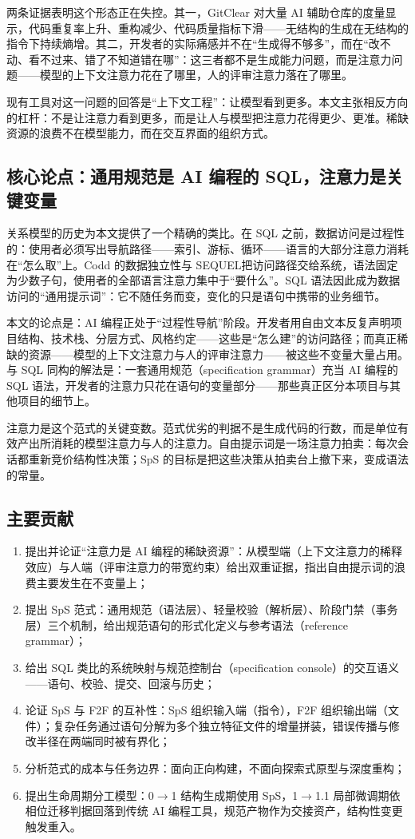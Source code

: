 \documentclass[11pt,a4paper]{ctexart}
\begin{document}
两条证据表明这个形态正在失控。其一，GitClear 对大量 AI 辅助仓库的度量显示，代码重复率上升、重构减少、代码质量指标下滑\cite{ref2}——无结构的生成在无结构的指令下持续熵增。其二，开发者的实际痛感并不在“生成得不够多”，而在“改不动、看不过来、错了不知道错在哪”：这三者都不是生成能力问题，而是注意力问题——模型的上下文注意力花在了哪里，人的评审注意力落在了哪里。

现有工具对这一问题的回答是“上下文工程”：让模型看到更多。本文主张相反方向的杠杆：不是让注意力看到更多，而是让人与模型把注意力花得更少、更准。稀缺资源的浪费不在模型能力，而在交互界面的组织方式。

\subsection{核心论点：通用规范是 AI 编程的 SQL，注意力是关键变量}
关系模型的历史为本文提供了一个精确的类比。在 SQL 之前，数据访问是过程性的：使用者必须写出导航路径——索引、游标、循环——语言的大部分注意力消耗在“怎么取”上。Codd 的数据独立性\cite{ref3}与 SEQUEL\cite{ref4}把访问路径交给系统，语法固定为少数子句，使用者的全部语言注意力集中于“要什么”。SQL 语法因此成为数据访问的“通用提示词”：它不随任务而变，变化的只是语句中携带的业务细节。

本文的论点是：AI 编程正处于“过程性导航”阶段。开发者用自由文本反复声明项目结构、技术栈、分层方式、风格约定——这些是“怎么建”的访问路径；而真正稀缺的资源——模型的上下文注意力\cite{ref10,ref11}与人的评审注意力——被这些不变量大量占用。与 SQL 同构的解法是：一套通用规范（specification grammar）充当 AI 编程的 SQL 语法，开发者的注意力只花在语句的变量部分——那些真正区分本项目与其他项目的细节上。

注意力是这个范式的关键变数。范式优劣的判据不是生成代码的行数，而是单位有效产出所消耗的模型注意力与人的注意力。自由提示词是一场注意力拍卖：每次会话都重新竞价结构性决策；SpS 的目标是把这些决策从拍卖台上撤下来，变成语法的常量。

\subsection{主要贡献}
\begin{enumerate}
\item 提出并论证“注意力是 AI 编程的稀缺资源”：从模型端（上下文注意力的稀释效应）与人端（评审注意力的带宽约束）给出双重证据，指出自由提示词的浪费主要发生在不变量上；
\item 提出 SpS 范式：通用规范（语法层）、轻量校验（解析层）、阶段门禁（事务层）三个机制，给出规范语句的形式化定义与参考语法（reference grammar）；
\item 给出 SQL 类比的系统映射与规范控制台（specification console）的交互语义——语句、校验、提交、回滚与历史；
\item 论证 SpS 与 F2F\cite{ref20} 的互补性：SpS 组织输入端（指令），F2F 组织输出端（文件）；复杂任务通过语句分解为多个独立特征文件的增量拼装，错误传播与修改半径在两端同时被有界化；
\item 分析范式的成本与任务边界：面向正向构建，不面向探索式原型与深度重构；
\item 提出生命周期分工模型：0$\to$1 结构生成期使用 SpS，1$\to$1.1 局部微调期依相位迁移判据回落到传统 AI 编程工具，规范产物作为交接资产，结构性变更触发重入。
\end{enumerate}
\end{document}
